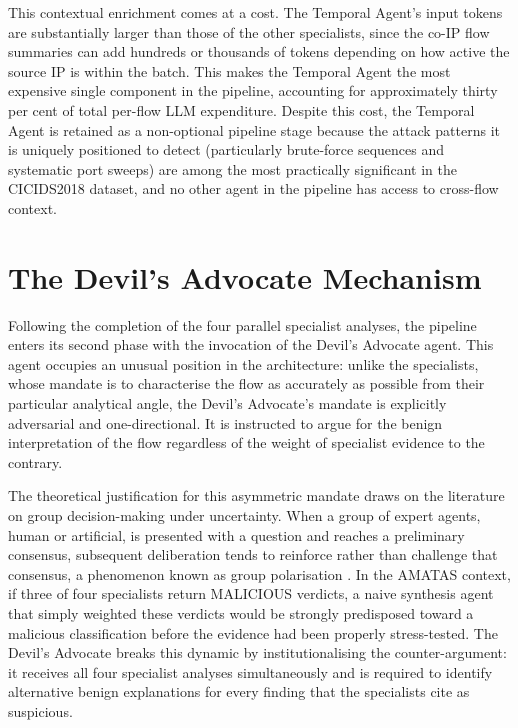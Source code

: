 This contextual enrichment comes at a cost. The Temporal Agent's input tokens are substantially larger than those of the other specialists, since the co-IP flow summaries can add hundreds or thousands of tokens depending on how active the source IP is within the batch. This makes the Temporal Agent the most expensive single component in the pipeline, accounting for approximately thirty per cent of total per-flow LLM expenditure. Despite this cost, the Temporal Agent is retained as a non-optional pipeline stage because the attack patterns it is uniquely positioned to detect (particularly brute-force sequences and systematic port sweeps) are among the most practically significant in the CICIDS2018 dataset, and no other agent in the pipeline has access to cross-flow context.

\section{The Devil's Advocate Mechanism}
\label{sec:devils-advocate}

Following the completion of the four parallel specialist analyses, the pipeline enters its second phase with the invocation of the Devil's Advocate agent. This agent occupies an unusual position in the architecture: unlike the specialists, whose mandate is to characterise the flow as accurately as possible from their particular analytical angle, the Devil's Advocate's mandate is explicitly adversarial and one-directional. It is instructed to argue for the benign interpretation of the flow regardless of the weight of specialist evidence to the contrary.

The theoretical justification for this asymmetric mandate draws on the literature on group decision-making under uncertainty. When a group of expert agents, human or artificial, is presented with a question and reaches a preliminary consensus, subsequent deliberation tends to reinforce rather than challenge that consensus, a phenomenon known as group polarisation \autocite{Sunstein2002}. In the AMATAS context, if three of four specialists return MALICIOUS verdicts, a naive synthesis agent that simply weighted these verdicts would be strongly predisposed toward a malicious classification before the evidence had been properly stress-tested. The Devil's Advocate breaks this dynamic by institutionalising the counter-argument: it receives all four specialist analyses simultaneously and is required to identify alternative benign explanations for every finding that the specialists cite as suspicious.

